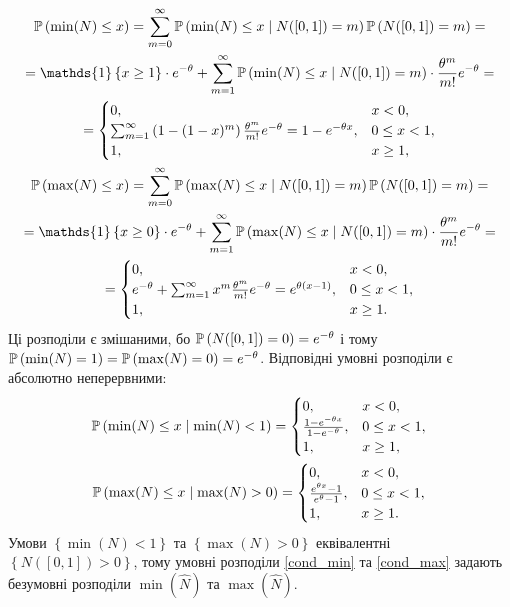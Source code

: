\begin{gather}
    \P{\min(N) \leq x} = \sum_{m=0}^{\infty} \P{\min(N) \leq x \mid N([0, 1]) = m} \P{N([0, 1]) = m} = \\
     = \mathds{1}\left\{x\geq 1\right\}\cdot e^{-\theta} +
    \sum_{m=1}^{\infty} \P{\min(N) \leq x \mid N([0, 1]) = m} \cdot \frac{\theta^m}{m!} e^{-\theta} = \\
    = \begin{cases}
        0, & x < 0, \\
        \sum_{m=1}^{\infty} \left(1 - (1 - x)^m\right) \frac{\theta^m}{m!} e^{-\theta} = 1 - e^{-\theta x}, & 0 \leq x < 1, \\
        1, & x \geq 1,
    \end{cases} \\
    \P{\max(N) \leq x} = \sum_{m=0}^{\infty} \P{\max(N) \leq x \mid N([0, 1]) = m} \P{N([0, 1]) = m} = \\
     = \mathds{1}\left\{x\geq 0\right\}\cdot e^{-\theta} +
    \sum_{m=1}^{\infty} \P{\max(N) \leq x \mid N([0, 1]) = m} \cdot \frac{\theta^m}{m!} e^{-\theta} = \\
    = \begin{cases}
        0, & x < 0, \\
        e^{-\theta} + \sum_{m=1}^{\infty} x^m \frac{\theta^m}{m!} e^{-\theta} = e^{\theta(x-1)}, & 0 \leq x < 1, \\
        1, & x \geq 1.
    \end{cases}
\end{gather}
Ці розподіли є змішаними, бо $\P{N([0, 1]) = 0} = e^{-\theta}$ і тому
$\P{\min(N) = 1} = \P{\max(N) = 0} = e^{-\theta}$. 
Відповідні умовні розподіли є абсолютно неперервними:
\begin{gather}\label{cond_min}
    \P{\min(N) \leq x \mid \min(N) < 1} = 
    \begin{cases}
        0, & x < 0, \\
        \frac{1-e^{-\theta x}}{1-e^{-\theta}}, & 0 \leq x < 1, \\
        1, & x \geq 1,
    \end{cases} \\
\label{cond_max}
    \P{\max(N) \leq x \mid \max(N) > 0} = 
    \begin{cases}
        0, & x < 0, \\
        \frac{e^{\theta x} - 1}{e^{\theta} - 1}, & 0 \leq x < 1, \\
        1, & x \geq 1.
    \end{cases}
\end{gather}
Умови $\left\{ \min(N) < 1\right\}$ та $\left\{ \max(N) > 0\right\}$
еквівалентні $\left\{N([0, 1]) > 0 \right\}$, тому 
умовні розподіли \eqref{cond_min} та \eqref{cond_max} 
задають безумовні розподіли $\min(\widehat{N})$ та $\max(\widehat{N})$.

